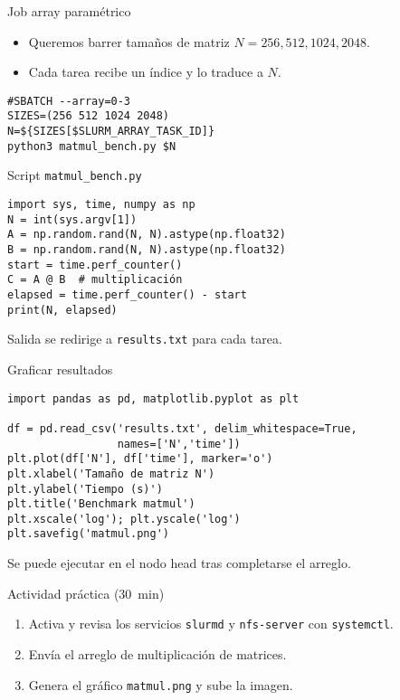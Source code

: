 \documentclass[aspectratio=169,professionalfonts]{beamer}
\begin{document}
\begin{frame}[fragile]{Job array paramétrico}
  \begin{itemize}
    \item Queremos barrer tamaños de matriz \(N = 256,512,1024,2048\).
    \item Cada tarea recibe un índice y lo traduce a \(N\).
  \end{itemize}
  \begin{verbatim}
#SBATCH --array=0-3
SIZES=(256 512 1024 2048)
N=${SIZES[$SLURM_ARRAY_TASK_ID]}
python3 matmul_bench.py $N
  \end{verbatim}
\end{frame}

\begin{frame}[fragile]{Script \texttt{matmul\_bench.py}}
  \begin{verbatim}
import sys, time, numpy as np
N = int(sys.argv[1])
A = np.random.rand(N, N).astype(np.float32)
B = np.random.rand(N, N).astype(np.float32)
start = time.perf_counter()
C = A @ B  # multiplicación
elapsed = time.perf_counter() - start
print(N, elapsed)
  \end{verbatim}
  Salida se redirige a \texttt{results.txt} para cada tarea.
\end{frame}

\begin{frame}[fragile]{Graficar resultados}
  \begin{verbatim}
import pandas as pd, matplotlib.pyplot as plt

df = pd.read_csv('results.txt', delim_whitespace=True,
                 names=['N','time'])
plt.plot(df['N'], df['time'], marker='o')
plt.xlabel('Tamaño de matriz N')
plt.ylabel('Tiempo (s)')
plt.title('Benchmark matmul')
plt.xscale('log'); plt.yscale('log')
plt.savefig('matmul.png')
  \end{verbatim}
  Se puede ejecutar en el nodo head tras completarse el arreglo.
\end{frame}

\begin{frame}[fragile]{Actividad práctica (30 min)}
  \begin{enumerate}
    \item Activa y revisa los servicios \texttt{slurmd} y \texttt{nfs-server} con \texttt{systemctl}.
    \item Envía el arreglo de multiplicación de matrices.
    \item Genera el gráfico \texttt{matmul.png} y sube la imagen.
  \end{enumerate}
\end{frame}
\end{document}

